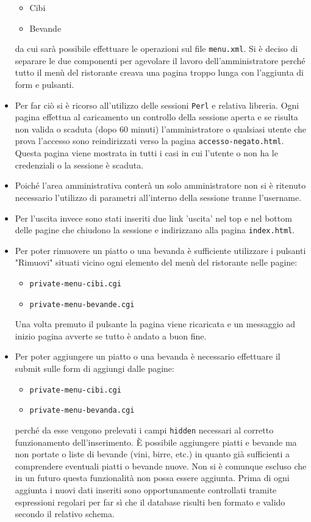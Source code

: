 \documentclass[../relazione.tex]{subfiles}
\begin{document}
\begin{itemize}
			\begin{itemize}
				\item Cibi
				\item Bevande
			\end{itemize}
da cui sarà possibile effettuare le operazioni sul file \texttt{menu.xml}. Si è deciso di separare le due componenti per agevolare il lavoro dell'amministratore perché tutto il menù del ristorante creava una pagina troppo lunga con l'aggiunta di form e pulsanti.
		\item Per far ciò si è ricorso all'utilizzo delle sessioni \texttt{Perl} e relativa libreria. Ogni pagina effettua al caricamento un controllo della sessione aperta e se risulta non valida o scaduta (dopo 60 minuti) l'amministratore o qualsiasi utente che prova l'accesso sono reindirizzati verso la pagina \texttt{accesso-negato.html}. Questa pagina viene mostrata in tutti i casi in cui l'utente o non ha le credenziali o la sessione è scaduta.
		\item Poiché l'area amministrativa conterà un solo amministratore non si è ritenuto necessario l'utilizzo di parametri all'interno della sessione tranne l'username.
		\item Per l'uscita invece sono stati inseriti due link 'uscita' nel top e nel bottom delle pagine che chiudono la sessione e indirizzano alla pagina \texttt{index.html}.
		\item Per poter rimuovere un piatto o una bevanda è sufficiente utilizzare i pulsanti "Rimuovi" situati vicino ogni elemento del menù del ristorante nelle pagine:
			\begin{itemize}
				\item \texttt{private-menu-cibi.cgi}
				\item \texttt{private-menu-bevande.cgi}
			\end{itemize}
			Una volta premuto il pulsante la pagina viene ricaricata e un messaggio ad inizio pagina avverte se tutto è andato a buon fine.
		\item Per poter aggiungere un piatto o una bevanda è necessario effettuare il submit sulle form di aggiungi dalle pagine:
			\begin{itemize}
				\item \texttt{private-menu-cibi.cgi}
				\item \texttt{private-menu-bevanda.cgi}
			\end{itemize}
			perché da esse vengono prelevati i campi \texttt{hidden} necessari al corretto funzionamento dell'inserimento. È possibile aggiungere piatti e bevande ma non portate o liste di bevande (vini, birre, etc.) in quanto già sufficienti a comprendere eventuali piatti o bevande nuove. Non si è comunque escluso che in un futuro questa funzionalità non possa essere aggiunta. Prima di ogni aggiunta i nuovi dati inseriti sono opportunamente controllati tramite espressioni regolari per far sì che il database risulti ben formato e valido secondo il relativo schema.

\end{itemize}
\end{document}
